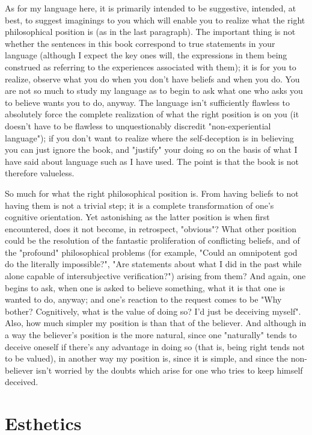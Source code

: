 \documentclass[10pt,twoside,draft]{memoir}
\begin{document}
{As for my language here, it is primarily intended to be suggestive, 
intended, at best, to suggest imaginings to you which will enable you to 
realize what the right philosophical position is (as in the last paragraph). The 
important thing is not whether the sentences in this book correspond to true 
statements in your language (although I expect the key ones will, the 
expressions in them being construed as referring to the experiences 
associated with them); it is for you to realize, observe what you do when 
you don't have beliefs and when you do. You are not so much to study my 
language as to begin to ask what one who asks you to believe wants you to 
do, anyway. The language isn't sufficiently flawless to absolutely force the 
complete realization of what the right position is on you (it doesn't have to 
be flawless to unquestionably discredit "non-experiential language"); if you 
don't want to realize where the self-deception is in believing you can just 
ignore the book, and "justify" your doing so on the basis of what I have said 
about language such as I have used. The point is that the book is not 
therefore valueless. 

So much for what the right philosophical position is. From having 
beliefs to not having them is not a trivial step; it is a complete 
transformation of one's cognitive orientation. Yet astonishing as the latter 
position is when first encountered, does it not become, in retrospect, 
"obvious"? What other position could be the resolution of the fantastic 
proliferation of conflicting beliefs, and of the "profound" philosophical 
problems (for example, "Could an omnipotent god do the literally 
impossible?", "Are statements about what I did in the past while alone 
capable of intersubjective verification?") arising from them? And again, one 
begins to ask, when one is asked to believe something, what it is that one is 
wanted to do, anyway; and one's reaction to the request comes to be "Why 
bother? Cognitively, what is the value of doing so? I'd just be deceiving 
myself". Also, how much simpler my position is than that of the believer. 
And although in a way the believer's position is the more natural, since one 
"naturally" tends to deceive oneself if there's any advantage in doing so 
(that is, being right tends not to be valued), in another way my position is, 
since it is simple, and since the non-believer isn't worried by the doubts 
which arise for one who tries to keep himself deceived. 

\part{Esthetics}

}
\end{document}
